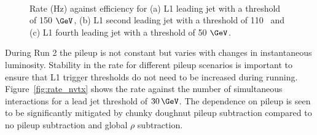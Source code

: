 \begin{figure}[h!]
  \centering
    ~
    \\
  \caption{\label{fig:rate_eff_jets} Rate (Hz) against efficiency for (a) L1 leading jet with a threshold of 150 $\GeV$, 
  (b) L1 second leading jet with a threshold of 110 \GeV~and (c) L1 fourth leading jet with a threshold of 50 $\GeV$.}
\end{figure}

During Run 2 the pileup is not constant but varies with changes in instantaneous luminosity. 
Stability in the rate for different pileup scenarios is important to ensure that L1 trigger thresholds 
do not need to be increased during running. Figure~\ref{fig:rate_nvtx} shows the rate against the number of 
simultaneous interactions for a lead jet threshold of $30\,\GeV$. The dependence on pileup is 
seen to be significantly mitigated by chunky doughnut pileup subtraction compared to no pileup subtraction and global $\rho$
subtraction. 

